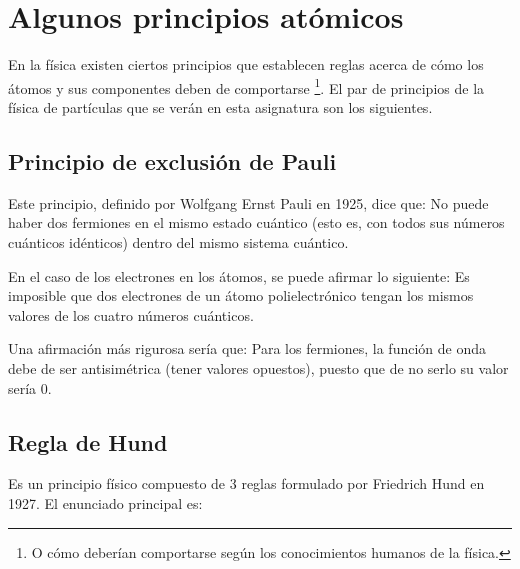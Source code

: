 
\section{Algunos principios atómicos}

En la física existen ciertos principios que establecen reglas acerca de cómo los átomos y sus componentes deben de comportarse \footnote{O cómo deberían comportarse según los conocimientos humanos de la física.}. El par de principios de la física de partículas que se verán en esta asignatura son los siguientes.

\subsection{Principio de exclusión de Pauli}

Este principio, definido por Wolfgang Ernst Pauli en 1925, dice que: No puede haber dos fermiones en el mismo estado cuántico (esto es, con todos sus números cuánticos idénticos) dentro del mismo sistema cuántico.


En el caso de los electrones en los átomos, se puede afirmar lo siguiente: Es imposible que dos electrones de un átomo polielectrónico tengan los mismos valores de los cuatro números cuánticos.

Una afirmación más rigurosa sería que: Para los fermiones, la función de onda debe de ser antisimétrica (tener valores opuestos), puesto que de no serlo su valor sería 0.

\subsection{Regla de Hund}

Es un principio físico compuesto de 3 reglas formulado por Friedrich Hund en 1927. El enunciado principal es:

